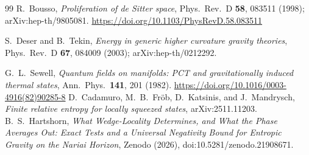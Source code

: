 \documentclass[11pt]{article}
\begin{document}
\begin{thebibliography}{99}
 R.~Bousso, \emph{Proliferation of de Sitter space}, Phys.\ Rev.\ D \textbf{58}, 083511 (1998); arXiv:hep-th/9805081. \url{https://doi.org/10.1103/PhysRevD.58.083511}

 S.~Deser and B.~Tekin, \emph{Energy in generic higher curvature gravity theories}, Phys.\ Rev.\ D \textbf{67}, 084009 (2003); arXiv:hep-th/0212292.

 G.~L.~Sewell, \emph{Quantum fields on manifolds: PCT and gravitationally induced thermal states}, Ann.\ Phys.\ \textbf{141}, 201 (1982). \url{https://doi.org/10.1016/0003-4916(82)90285-8}
 D.~Cadamuro, M.~B.~Fr\"ob, D.~Katsinis, and J.~Mandrysch, \emph{Finite relative entropy for locally squeezed states}, arXiv:2511.11203.
 B.~S.~Hartshorn, \emph{What Wedge-Locality Determines, and What the Phase Averages Out: Exact Tests and a Universal Negativity Bound for Entropic Gravity on the Nariai Horizon}, Zenodo (2026), doi:10.5281/zenodo.21908671.
\end{thebibliography}
\endgroup
\end{document}
